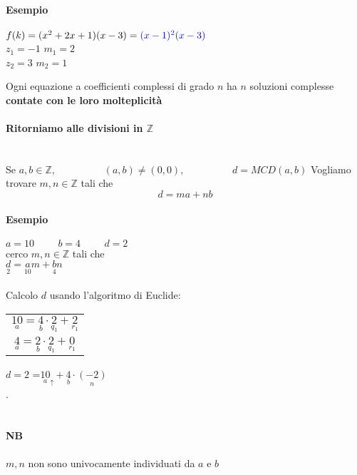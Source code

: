     \paragraph{Esempio} $f(k)=(x^2+2x+1)(x-3)={\color{blue}(x-1)^2(x-3)}$\\
    {\color{blue} 
    $z_1=-1$ $m_1=2$\\
    $z_2=3$ $m_2=1$}\\
    \begin{center}
    {\color{red} Ogni equazione a coefficienti complessi di grado $n$ ha $n$ soluzioni complesse\\
    \textbf{contate con le loro molteplicità}}
    \end{center}
    \paragraph{Ritorniamo alle divisioni in $\mathbb{Z}$} \mbox{} \\
    Se $a,b\in\mathbb{Z},\hspace{2cm}(a,b)\neq(0,0),\hspace{2cm}d=MCD(a,b)$
    Vogliamo trovare $m,n\in\mathbb{Z}$ tali che
    $$d=ma+nb$$
    \paragraph{Esempio} 
        $a=10\hspace{1cm}b=4\hspace{1cm}d=2$ \\cerco $m,n\in\mathbb{Z}$ tali che\\
    $\underset{2}{d}=\underset{10}{a}m+\underset{4}{b}n$\\\\
    Calcolo $d$ usando l'algoritmo di Euclide:\\

    \begin{tabular}{c}
        $\underset{a}{10}=\underset{b}{4}\cdot\underset{q_1}{2}+\underset{r_1}{2}$\\
        $\underset{a}{4}=\underset{b}{2}\cdot\underset{q_1}{2}+\underset{r_1}{0}$
    \end{tabular} $d=2$
    {\color{blue}=$ \underset{a}{10}\underset{\uparrow}{}+\underset{b}{4}\cdot\underset{n}{(-2)}$}\\
    . \\\\
    {\color{red} \paragraph{NB} $m,n$ non sono univocamente individuati da $a$ e $b$}
